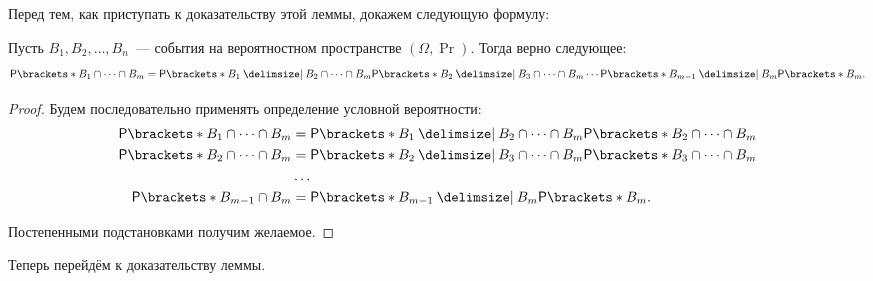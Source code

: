 Перед тем, как приступать к доказательству этой леммы, докажем следующую формулу:
\begin{theorem}
    Пусть \(B_1, B_2, \dots, B_n\)~--- события на вероятностном пространстве \((\Omega, \Pr)\). Тогда верно следующее:
    \[\Pr{B_1 \cap \dots \cap B_m} = \Pr{B_1 \given B_2 \cap \dots \cap B_m}\Pr{B_2 \given B_3 \cap \dots \cap B_m} \dotsm \Pr{B_{m-1} \given B_m}\Pr{B_m}.\]
\end{theorem}
\begin{proof}
    Будем последовательно применять определение условной вероятности:
    \[\begin{aligned}
    \Pr{B_1 \cap \dots \cap B_m} &= \Pr{B_1 \given B_2 \cap \dots \cap B_m}\Pr{B_2 \cap \dots \cap B_m} \\
    \Pr{B_2 \cap \dots \cap B_m} &= \Pr{B_2 \given B_3 \cap \dots \cap B_m}\Pr{B_3 \cap \dots \cap B_m} \\
    &\dots \\
    \Pr{B_{m - 1} \cap B_m}&= \Pr{B_{m-1} \given B_m}\Pr{B_m}.
    \end{aligned}\]
    
    Постепенными подстановками получим желаемое.
\end{proof}

Теперь перейдём к доказательству леммы.

